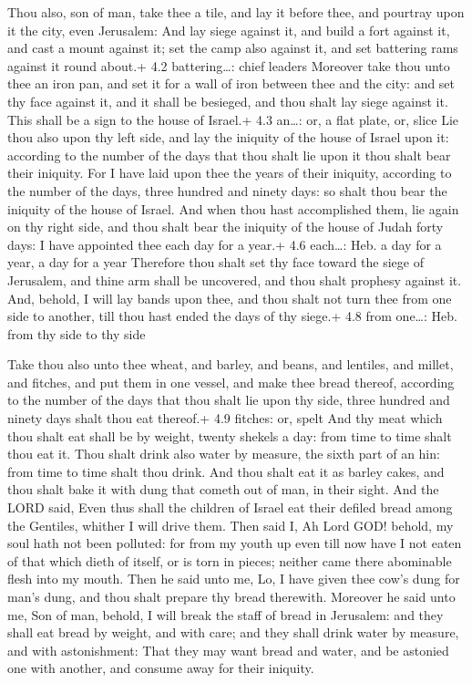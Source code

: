  Thou also, son of man, take thee a tile, and lay it before
thee, and pourtray upon it the city, even Jerusalem:  And
lay siege against it, and build a fort against it, and cast a mount
against it; set the camp also against it, and set battering rams against
it round about.+ 4.2 battering\ldots: chief leaders 
Moreover take thou unto thee an iron pan, and set it for a wall of iron
between thee and the city: and set thy face against it, and it shall be
besieged, and thou shalt lay siege against it. This shall be a sign to
the house of Israel.+ 4.3 an\ldots: or, a flat plate, or, slice
 Lie thou also upon thy left side, and lay the iniquity of
the house of Israel upon it: according to the number of the days that
thou shalt lie upon it thou shalt bear their iniquity.  For
I have laid upon thee the years of their iniquity, according to the
number of the days, three hundred and ninety days: so shalt thou bear
the iniquity of the house of Israel.  And when thou hast
accomplished them, lie again on thy right side, and thou shalt bear the
iniquity of the house of Judah forty days: I have appointed thee each
day for a year.+ 4.6 each\ldots: Heb. a day for a year, a day for a year
 Therefore thou shalt set thy face toward the siege of
Jerusalem, and thine arm shall be uncovered, and thou shalt prophesy
against it.  And, behold, I will lay bands upon thee, and
thou shalt not turn thee from one side to another, till thou hast ended
the days of thy siege.+ 4.8 from one\ldots: Heb. from thy side to thy
side

 Take thou also unto thee wheat, and barley, and beans,
and lentiles, and millet, and fitches, and put them in one vessel, and
make thee bread thereof, according to the number of the days that thou
shalt lie upon thy side, three hundred and ninety days shalt thou eat
thereof.+ 4.9 fitches: or, spelt  And thy meat which thou
shalt eat shall be by weight, twenty shekels a day: from time to time
shalt thou eat it.  Thou shalt drink also water by measure,
the sixth part of an hin: from time to time shalt thou drink.
 And thou shalt eat it as barley cakes, and thou shalt bake
it with dung that cometh out of man, in their sight.  And
the LORD said, Even thus shall the children of Israel eat their defiled
bread among the Gentiles, whither I will drive them.  Then
said I, Ah Lord GOD! behold, my soul hath not been polluted: for from my
youth up even till now have I not eaten of that which dieth of itself,
or is torn in pieces; neither came there abominable flesh into my mouth.
 Then he said unto me, Lo, I have given thee cow's dung for
man's dung, and thou shalt prepare thy bread therewith. 
Moreover he said unto me, Son of man, behold, I will break the staff of
bread in Jerusalem: and they shall eat bread by weight, and with care;
and they shall drink water by measure, and with astonishment:
 That they may want bread and water, and be astonied one
with another, and consume away for their iniquity.

